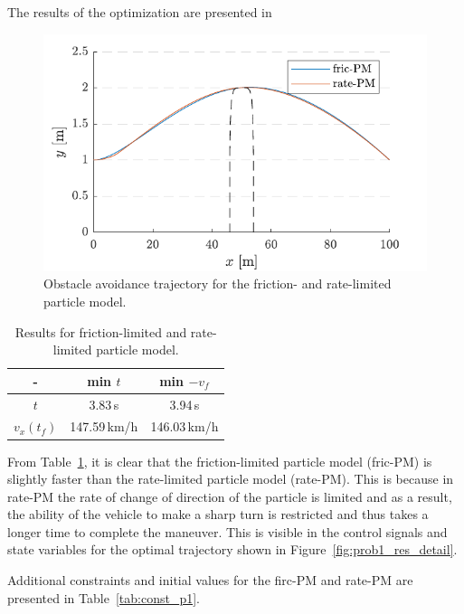 The results of the optimization are presented in 

\begin{figure}[h!]
    \centering
    \includegraphics{figures/flp_avoid.pdf}
    \caption{Obstacle avoidance trajectory for the friction- and rate-limited particle model.}
    \label{fig:res_traj_p1}
\end{figure}

\pagebreak

\begin{table}[h]
    \centering
    \begin{tabular}{c|c|c}
        - & min $t$ & min $-v_f$ \\
        \hline
        $t$ & 3.83\,s & 3.94\,s \\
        $v_x(t_f)$ & 147.59\,km/h & 146.03\,km/h\\
    \end{tabular}
    \caption{Results for friction-limited and rate-limited particle model.}
    \label{tab:prob1_res}
\end{table}

From Table~\ref{tab:prob1_res}, it is clear that the friction-limited particle model (fric-PM) is slightly faster than the rate-limited particle model (rate-PM). 
This is because in rate-PM the rate of change of direction of the particle is limited and as a result, the ability of the vehicle to make a sharp turn is restricted and thus takes a longer time to complete the maneuver. 
This is visible in the control signals and state variables for the optimal trajectory shown in Figure~\ref{fig:prob1_res_detail}. 

Additional constraints and initial values for the firc-PM and rate-PM are presented in Table~\ref{tab:const_p1}. 


